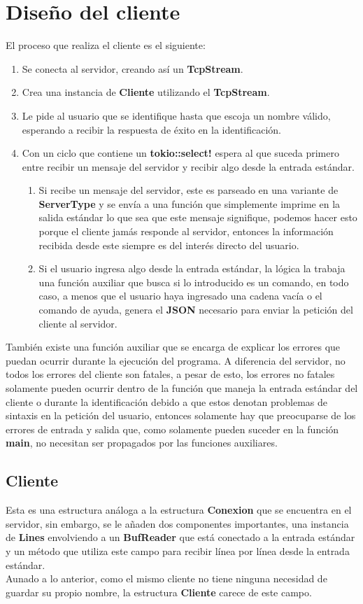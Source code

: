 \documentclass[11pt]{article}
\begin{document}
\section{Diseño del cliente}
El proceso que realiza el cliente es el siguiente:

\begin{enumerate}
    \item Se conecta al servidor, creando así un \textbf{TcpStream}.
    \item Crea una instancia de \textbf{Cliente} utilizando el \textbf{TcpStream}.
    \item Le pide al usuario que se identifique hasta que escoja un nombre válido, esperando a recibir la respuesta de éxito en la identificación.
    \item Con un ciclo que contiene un \textbf{tokio::select!} espera al que suceda primero entre recibir un mensaje del servidor y recibir algo desde la entrada estándar.
    \begin{enumerate}
        \item Si recibe un mensaje del servidor, este es parseado en una variante de \textbf{ServerType} y se envía a una función que simplemente imprime en la salida estándar lo que sea que este mensaje signifique, podemos hacer esto porque el cliente jamás responde al servidor, entonces la información recibida desde este siempre es del interés directo del usuario.
        \item Si el usuario ingresa algo desde la entrada estándar, la lógica la trabaja una función auxiliar que busca si lo introducido es un comando, en todo caso, a menos que el usuario haya ingresado una cadena vacía o el comando de ayuda, genera el \textbf{JSON} necesario para enviar la petición del cliente al servidor.
    \end{enumerate}
\end{enumerate}
También existe una función auxiliar que se encarga de explicar los errores que puedan ocurrir durante la ejecución del programa. A diferencia del servidor, no todos los errores del cliente son fatales, a pesar de esto, los errores no fatales solamente pueden ocurrir dentro de la función que maneja la entrada estándar del cliente o durante la identificación debido a que estos denotan problemas de sintaxis en la petición del usuario, entonces solamente hay que preocuparse de los errores de entrada y salida que, como solamente pueden suceder en la función \textbf{main}, no necesitan ser propagados por las funciones auxiliares.

\subsection{Cliente}
Esta es una estructura análoga a la estructura \textbf{Conexion} que se encuentra en el servidor, sin embargo, se le añaden dos componentes importantes, una instancia de \textbf{Lines} envolviendo a un \textbf{BufReader} que está conectado a la entrada estándar y un método que utiliza este campo para recibir línea por línea desde la entrada estándar.\\
Aunado a lo anterior, como el mismo cliente no tiene ninguna necesidad de guardar su propio nombre, la estructura \textbf{Cliente} carece de este campo.
\end{document}
